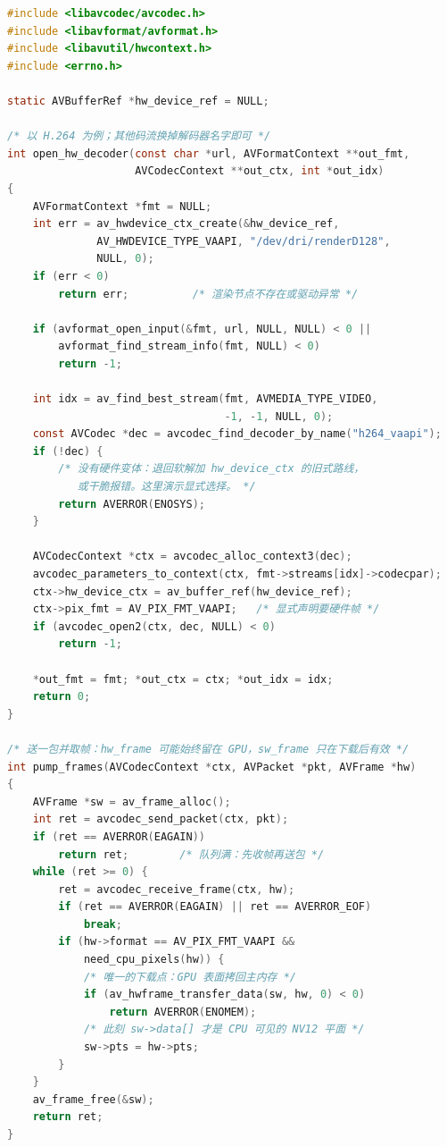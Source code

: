 \documentclass[12pt,a4paper,fontset=fandol]{ctexbook}
\begin{document}
\begin{lstlisting}[style=cstyle,language=C,
  caption={打开硬件解码器并取回帧的完整流程},
  label={lst:ch08-hwdecode}]
#include <libavcodec/avcodec.h>
#include <libavformat/avformat.h>
#include <libavutil/hwcontext.h>
#include <errno.h>

static AVBufferRef *hw_device_ref = NULL;

/* 以 H.264 为例；其他码流换掉解码器名字即可 */
int open_hw_decoder(const char *url, AVFormatContext **out_fmt,
                    AVCodecContext **out_ctx, int *out_idx)
{
    AVFormatContext *fmt = NULL;
    int err = av_hwdevice_ctx_create(&hw_device_ref,
              AV_HWDEVICE_TYPE_VAAPI, "/dev/dri/renderD128",
              NULL, 0);
    if (err < 0)
        return err;          /* 渲染节点不存在或驱动异常 */

    if (avformat_open_input(&fmt, url, NULL, NULL) < 0 ||
        avformat_find_stream_info(fmt, NULL) < 0)
        return -1;

    int idx = av_find_best_stream(fmt, AVMEDIA_TYPE_VIDEO,
                                  -1, -1, NULL, 0);
    const AVCodec *dec = avcodec_find_decoder_by_name("h264_vaapi");
    if (!dec) {
        /* 没有硬件变体：退回软解加 hw_device_ctx 的旧式路线，
           或干脆报错。这里演示显式选择。 */
        return AVERROR(ENOSYS);
    }

    AVCodecContext *ctx = avcodec_alloc_context3(dec);
    avcodec_parameters_to_context(ctx, fmt->streams[idx]->codecpar);
    ctx->hw_device_ctx = av_buffer_ref(hw_device_ref);
    ctx->pix_fmt = AV_PIX_FMT_VAAPI;   /* 显式声明要硬件帧 */
    if (avcodec_open2(ctx, dec, NULL) < 0)
        return -1;

    *out_fmt = fmt; *out_ctx = ctx; *out_idx = idx;
    return 0;
}

/* 送一包并取帧：hw_frame 可能始终留在 GPU，sw_frame 只在下载后有效 */
int pump_frames(AVCodecContext *ctx, AVPacket *pkt, AVFrame *hw)
{
    AVFrame *sw = av_frame_alloc();
    int ret = avcodec_send_packet(ctx, pkt);
    if (ret == AVERROR(EAGAIN))
        return ret;        /* 队列满：先收帧再送包 */
    while (ret >= 0) {
        ret = avcodec_receive_frame(ctx, hw);
        if (ret == AVERROR(EAGAIN) || ret == AVERROR_EOF)
            break;
        if (hw->format == AV_PIX_FMT_VAAPI &&
            need_cpu_pixels(hw)) {
            /* 唯一的下载点：GPU 表面拷回主内存 */
            if (av_hwframe_transfer_data(sw, hw, 0) < 0)
                return AVERROR(ENOMEM);
            /* 此刻 sw->data[] 才是 CPU 可见的 NV12 平面 */
            sw->pts = hw->pts;
        }
    }
    av_frame_free(&sw);
    return ret;
}
\end{lstlisting}
\end{document}
